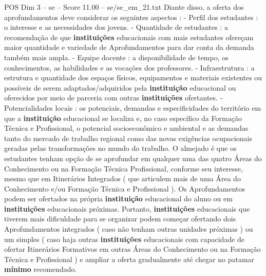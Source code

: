 \begin{textsample}{POS Dim 3 – se – Score 11.00 – se/se\_em\_21.txt}
Diante disso, a oferta dos aprofundamentos deve considerar os seguintes aspectos : - Perfil dos estudantes : o interesse e as necessidades dos jovens. - Quantidade de estudantes : a recomendação de que \textbf{instituições} educacionais com mais estudantes ofereçam maior quantidade e variedade de Aprofundamentos para dar conta da demanda também mais ampla. - Equipe docente : a disponibilidade de tempo, os conhecimentos, as habilidades e as vocações dos professores. - Infraestrutura : a estrutura e quantidade dos espaços físicos, equipamentos e materiais existentes ou possíveis de serem adaptados/adquiridos pela \textbf{instituição} educacional ou oferecidos por meio de parceria com outras \textbf{instituições} ofertantes. - Potencialidades locais : os potenciais, demandas e especificidades do território em que a \textbf{instituição} educacional se localiza e, no caso específico da Formação Técnica e Profissional, o potencial socioeconômico e ambiental e as demandas tanto do mercado de trabalho regional como das novas exigências ocupacionais geradas pelas transformações no mundo do trabalho.
O almejado é que os estudantes tenham opção de se aprofundar em qualquer uma das quatro Áreas do Conhecimento ou na Formação Técnica Profissional, conforme seu interesse, mesmo que em Itinerários Integrados ( que articulem mais de uma Área do Conhecimento e/ou Formação Técnica e Profissional ).
Os Aprofundamentos podem ser ofertados na própria \textbf{instituição} educacional do aluno ou em \textbf{instituições} educacionais próximas.
Portanto, \textbf{instituições} educacionais que tiverem mais dificuldade para se organizar podem começar ofertando dois Aprofundamentos integrados ( caso não tenham outras unidades próximas ) ou um simples ( caso haja outras \textbf{instituições} educacionais com capacidade de ofertar Itinerários Formativos em outras Áreas do Conhecimento ou na Formação Técnica e Profissional ) e ampliar a oferta gradualmente até chegar no patamar \textbf{mínimo} recomendado.

\end{textsample}
